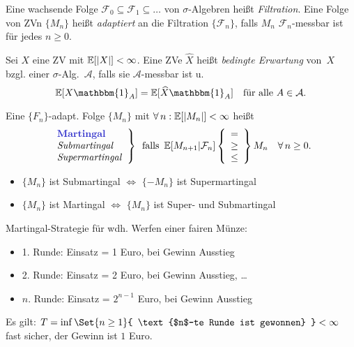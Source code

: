 \documentclass{cheat-sheet}
\newcommand{\E}{\mathbb{E}} %
\newcommand{\ind}{\mathbbm{1}} %
\newcommand{\Filt}{\mathcal{F}} %
\begin{document}
\begin{defn}
  Eine wachsende Folge $\Filt_0 \subseteq \Filt_1 \subseteq \ldots$ von $\sigma$-Algebren heißt \emph{Filtration}.
  Eine Folge von ZVn $\{ M_n \}$ heißt \emph{adaptiert} an die Filtration $\{ \Filt_n \}$, falls $M_n$ $\Filt_n$-messbar ist für jedes $n \geq 0$.
\end{defn}

\begin{defn}
  Sei $X$ eine ZV mit $\E[\abs{X}] < \infty$.
  Eine ZVe $\widehat{X}$ heißt \emph{bedingte Erwartung} von~$X$ bzgl. einer $\sigma$-Alg.~$\mathcal{A}$, falls sie $\mathcal{A}$-messbar ist u.
  \[
    \E[X \ind_A] = \E[\widehat{X} \ind_A] \quad
    \text{für alle $A \in \mathcal{A}$.}
  \]
\end{defn}

\begin{defn}
  Eine $\{ F_n \}$-adapt. Folge $\{ M_n \}$ mit $\fa{n\!}\! \E[\abs{M_n}] < \infty$ heißt
  \[
    \left. \begin{array}{l}
      \text{\emph{Martingal}}\\
      \text{\textit{Submartingal}}\\
      \text{\textit{Supermartingal}}\\
    \end{array} \right\}
    \enspace \text{falls} \enspace
    \E[M_{n+1} | \Filt_n]
    \left\{ \begin{array}{l}
      =\\
      \geq\\
      \leq
    \end{array} \right\}
    M_n
    \quad \forall\,n \geq 0.
  \]
\end{defn}

\begin{bem}
  \begin{itemize}
    \item $\{ M_n \}$ ist Submartingal $\iff$ $\{ -M_n \}$ ist Supermartingal
    \item $\{ M_n \}$ ist Martingal $\iff$ $\{ M_n \}$ ist Super- und Submartingal
  \end{itemize}
\end{bem}

\begin{bem}
  Martingal-Strategie für wdh. Werfen einer fairen Münze:
  \begin{itemize}
    \item 1. Runde: Einsatz = 1 Euro, bei Gewinn Ausstieg
    \item 2. Runde: Einsatz = 2 Euro, bei Gewinn Ausstieg, \ldots
    \item $n$. Runde: Einsatz = $2^{n-1}$ Euro, bei Gewinn Ausstieg
  \end{itemize}
  Es gilt: $T = \inf \Set{ n \geq 1 }{ \text{$n$-te Runde ist gewonnen} } < \infty$ fast sicher, der Gewinn ist $1$ Euro.
\end{bem}
\end{document}
